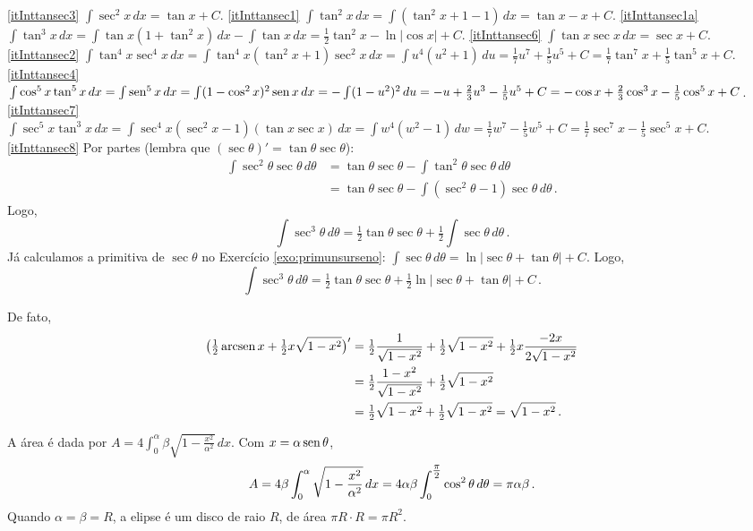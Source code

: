 \begin{Solution}{9.27}
\eqref{itInttansec3} $\int \sec^2x\,dx=\tan x+C$.
\eqref{itInttansec1} $\int\tan^2x \,dx=\int(\tan^2x+1-1)\,dx=\tan x-x+C$.
\eqref{itInttansec1a} $\int\tan^3x \,dx=\int\tan x(1+\tan^2x)\,dx-\int \tan x\,dx=\tfrac12\tan^2 x-\ln
|\cos x|+C$.
\eqref{itInttansec6} $\int \tan x\sec x\,dx=\sec x+C$.
\eqref{itInttansec2} $\int\tan^4 x\sec^4x\,dx=\int
\tan^4x(\tan^2x+1)\sec^2x\,dx=\int u^4(u^2+1)\,du=
\tfrac17u^7+\tfrac15u^5+C=\tfrac17\tan^7x+\tfrac15\tan^5x+C$.
\eqref{itInttansec4} $\int\cos^5x\tan^5x\,dx=\int
\operatorname{sen}^5x\,dx=\int(1-\cos^2x)^2\operatorname{sen} x\,dx=
-\int(1-u^2)^2\,du=-u+\tfrac23u^3-\tfrac15 u^5+C=
-\cos x+\tfrac23\cos^3x-\tfrac15 \cos^5x+C$.
\eqref{itInttansec7} $\int \sec^5x\tan^3x\,dx=\int \sec^4x(\sec^2x-1)(\tan x\sec
x)\,dx=\int w^4(w^2-1)\,dw=\tfrac17 w^7-\tfrac15 w^5+C=\tfrac17 \sec^7x-\tfrac15
\sec^5x+C$.
\eqref{itInttansec8} Por partes (lembra que
$(\sec\theta)'=\tan\theta\sec\theta$):
\begin{align*}
 \int\sec^2\theta\sec\theta\,d\theta
&=\tan \theta\sec\theta-\int\tan^2\theta\sec\theta\,d\theta\\
&=\tan \theta\sec\theta-\int(\sec^2\theta-1)\sec\theta\,d\theta\,.
\end{align*}
Logo,
$$
\int\sec^3\theta\,d\theta=
\tfrac12\tan\theta\sec\theta+\tfrac12\int\sec\theta\,d\theta\,.
$$
Já calculamos a primitiva de $\sec \theta$ no Exercício
\ref{exo:primunsurseno}:
$\int\sec\theta\,d\theta=\ln\bigl|\sec\theta+\tan \theta\bigr|+C$. Logo,
$$
\int\sec^3\theta\,d\theta=
\tfrac12\tan\theta\sec\theta+\tfrac12\ln\bigl|\sec\theta+\tan \theta\bigr|+C\,.
$$
\end{Solution}
\begin{Solution}{9.28}
De fato,
\begin{align*}
\bigl(\tfrac12\operatorname{arcsen} x+\tfrac12x\sqrt{1-x^2}\bigr)'&=
\tfrac12\frac{1}{\sqrt{1-x^2}}+\tfrac12
\sqrt{1-x^2}+\tfrac12 x\frac{-2x}{2\sqrt{1-x^2}} \\
&=\tfrac12\frac{1-x^2}{\sqrt{1-x^2}}+\tfrac12
\sqrt{1-x^2}\\
&=\tfrac12 \sqrt{1-x^2}+\tfrac12 \sqrt{1-x^2}=\sqrt{1-x^2}\,.
\end{align*}
\end{Solution}
\begin{Solution}{9.29}
A área é dada por $A=4\int_0^{\alpha}\beta\sqrt{1-\frac{x^2}{\alpha^2}}\,dx$.
Com $x=\alpha\operatorname{sen} \theta$,
$$A=4\beta\int_0^{\alpha}\sqrt{1-\frac{x^2}{\alpha^2}}\,dx=
4\alpha\beta \int_0^{\tfrac{\pi}{2}}\cos^2\theta\,d\theta=\pi \alpha\beta\,.
$$
Quando $\alpha=\beta=R$, a elipse é um disco de raio $R$, de área $\pi
R\cdot R=\pi R^2$.
\end{Solution}
